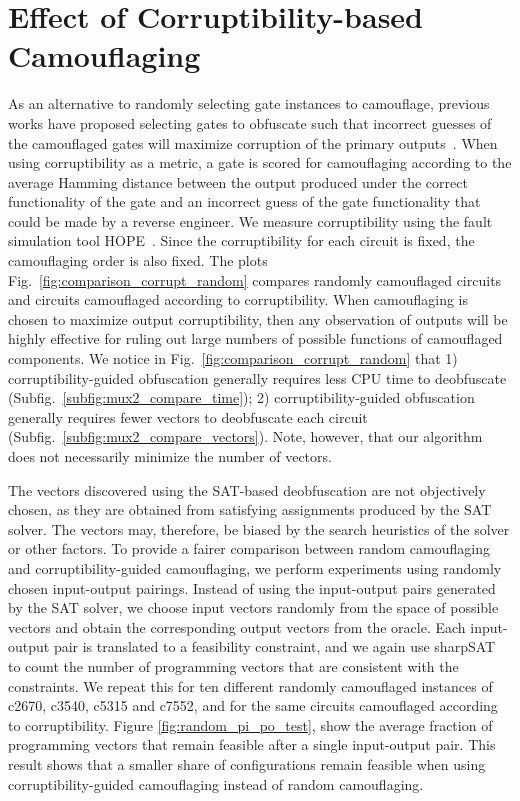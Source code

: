 \documentclass[proposal]{umassthesis}  %
\begin{document}
\section{Effect of Corruptibility-based Camouflaging}

As an alternative to randomly selecting gate instances to camouflage, previous works have proposed selecting gates to obfuscate such that incorrect guesses of the camouflaged gates will maximize corruption of the primary outputs~\cite{chakraborty-09,rajendran-13}. When using corruptibility as a metric, a gate is scored for camouflaging according to the average Hamming distance between the output produced under the correct functionality of the gate and an incorrect guess of the gate functionality that could be made by a reverse engineer. We measure corruptibility using the fault simulation tool HOPE~\cite{lee-96}. Since the corruptibility for each circuit is fixed, the camouflaging order is also fixed. The plots Fig.~\ref{fig:comparison_corrupt_random} compares randomly camouflaged circuits and circuits camouflaged according to corruptibility. When camouflaging is chosen to maximize output corruptibility, then any observation of outputs will be highly effective for ruling out large numbers of possible functions of camouflaged components. We notice in Fig.~\ref{fig:comparison_corrupt_random} that 1) corruptibility-guided obfuscation generally requires less CPU time to deobfuscate (Subfig.~\ref{subfig:mux2_compare_time}); 2) corruptibility-guided obfuscation generally requires fewer vectors to deobfuscate each circuit (Subfig.~\ref{subfig:mux2_compare_vectors}). Note, however, that our algorithm does not necessarily minimize the number of vectors.

{The vectors discovered using the SAT-based deobfuscation are not objectively chosen, as they are obtained from satisfying assignments produced by the SAT solver. The vectors may, therefore, be biased by the search heuristics of the solver or other factors. To provide a fairer comparison between random camouflaging and corruptibility-guided camouflaging, we perform experiments using randomly chosen input-output pairings. Instead of using the input-output pairs generated by the SAT solver, we choose input vectors randomly from the space of possible vectors and obtain the corresponding output vectors from the oracle. Each input-output pair is translated to a feasibility constraint, and we again use sharpSAT to count the number of programming vectors that are consistent with the constraints. We repeat this for ten different randomly camouflaged instances of c2670, c3540, c5315 and c7552, and for the same circuits camouflaged according to corruptibility. Figure \ref{fig:random_pi_po_test}, show the average fraction of programming vectors that remain feasible after a single input-output pair. This result shows that a smaller share of configurations remain feasible when using corruptibility-guided camouflaging instead of random camouflaging.}
\end{document}
